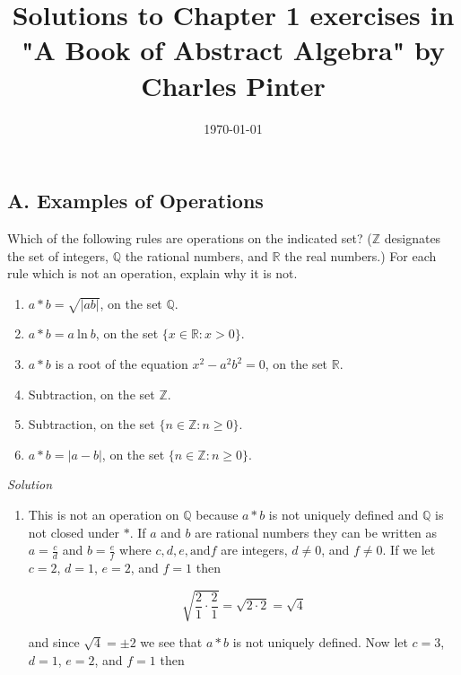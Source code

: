 \documentclass[12pt]{article}
\begin{document}
\title{ Solutions to Chapter 1 exercises in "A Book of Abstract Algebra" by Charles Pinter }

\date{\today}
\maketitle
\begin{flushleft}


\section*{A. Examples of Operations}

Which of the following rules are operations on the indicated set? ($\mathbb{Z}$ designates the set of integers, $\mathbb{Q}$ the rational numbers, and $\mathbb{R}$ the real numbers.) For each rule which is not an operation, explain why it is not.

\begin{enumerate}



\item $a * b = \sqrt{|ab|}$, on the set $\mathbb{Q}$.
\item $a * b = a~\text{ln}~b$, on the set $\{x \in \mathbb{R}: x > 0\}$.
\item $a * b$ is a root of the equation $x^{2} - a^{2}b^{2} = 0$, on the set $\mathbb{R}$.
\item Subtraction, on the set $\mathbb{Z}$.
\item Subtraction, on the set $\{ n \in \mathbb{Z}:n \geq 0 \}$.
\item $a * b = |a-b|$, on the set $\{ n \in \mathbb{Z}: n \geq 0 \}$.

\end{enumerate}

\textit{Solution} \\
\begin{enumerate}
\item This is not an operation on $\mathbb{Q}$ because $a * b$ is not uniquely defined and $\mathbb{Q}$ is not closed under $*$. If $a$ and $b$ are rational numbers they can be written as $a = \frac{c}{d}$ and $b = \frac{e}{f}$ where $c, d, e, \text{and} f$ are integers, $d \neq 0$, and $f \neq 0$. If we let $c = 2$, $d = 1$, $e = 2$, and $f = 1$ then

$$ \sqrt{ \frac{2}{1} \cdot \frac{2}{1} } = \sqrt{ 2 \cdot 2 } = \sqrt{4}$$  

and since $ \sqrt{4} = \pm 2$ we see that $a * b$ is not uniquely defined. Now let $c = 3$, $d = 1$, $e = 2$, and $f = 1$ then


\end{enumerate}
\end{flushleft}
\end{document}
